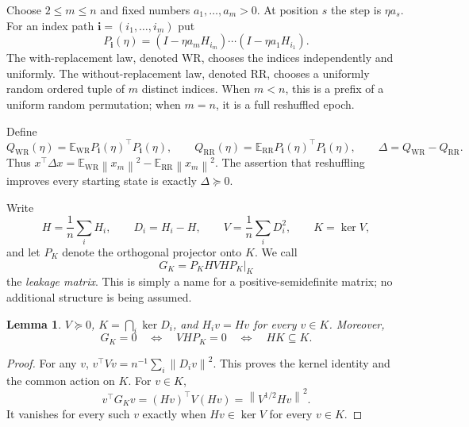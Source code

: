 \documentclass[11pt,letterpaper]{article}
\numberwithin{equation}{section}
\newtheorem{lemma}[theorem]{Lemma}
\theoremstyle{definition}
\newcommand{\E}{\mathbb E}
\newcommand{\WR}{\mathrm{WR}}
\newcommand{\RR}{\mathrm{RR}}
\newcommand{\norm}[1]{\left\lVert #1\right\rVert}
\begin{document}
Choose $2\le m\le n$ and fixed numbers $a_1,\ldots,a_m>0$. At position $s$ the step is $\eta a_s$. For an index path $\bm i=(i_1,\ldots,i_m)$ put
\begin{equation}\label{eq:path}
 P_{\bm i}(\eta)=(I-\eta a_mH_{i_m})\cdots(I-\eta a_1H_{i_1}).
\end{equation}
The with-replacement law, denoted $\WR$, chooses the indices independently and uniformly. The without-replacement law, denoted $\RR$, chooses a uniformly random ordered tuple of $m$ distinct indices. When $m<n$, this is a prefix of a uniform random permutation; when $m=n$, it is a full reshuffled epoch.

Define
\begin{equation}\label{eq:delta}
 Q_{\WR}(\eta)=\E_{\WR}P_{\bm i}(\eta)^\top P_{\bm i}(\eta),\qquad
 Q_{\RR}(\eta)=\E_{\RR}P_{\bm i}(\eta)^\top P_{\bm i}(\eta),\qquad
 \Delta=Q_{\WR}-Q_{\RR}.
\end{equation}
Thus $x^\top\Delta x=\E_{\WR}\norm{x_m}^2-\E_{\RR}\norm{x_m}^2$. The assertion that reshuffling improves every starting state is exactly $\Delta\succeq0$.

Write
\begin{equation}\label{eq:variance}
 H=\frac1n\sum_iH_i,\qquad D_i=H_i-H,\qquad
 V=\frac1n\sum_iD_i^2,\qquad K=\ker V,
\end{equation}
and let $P_K$ denote the orthogonal projector onto $K$. We call
\begin{equation}\label{eq:leakage}
 G_K=\left.P_KHVHP_K\right|_K
\end{equation}
the \emph{leakage matrix}. This is simply a name for a positive-semidefinite matrix; no additional structure is being assumed.

\begin{lemma}\label{lem:kernel}
$V\succeq0$, $K=\bigcap_i\ker D_i$, and $H_i v=Hv$ for every $v\in K$. Moreover,
\[
 G_K=0\quad\Longleftrightarrow\quad VHP_K=0
 \quad\Longleftrightarrow\quad HK\subseteq K.
\]
\end{lemma}
\begin{proof}
For any $v$, $v^\top Vv=n^{-1}\sum_i\norm{D_iv}^2$. This proves the kernel identity and the common action on $K$. For $v\in K$,
\[
 v^\top G_Kv=(Hv)^\top V(Hv)=\norm{V^{1/2}Hv}^2.
\]
It vanishes for every such $v$ exactly when $Hv\in\ker V$ for every $v\in K$.
\end{proof}
\end{document}
